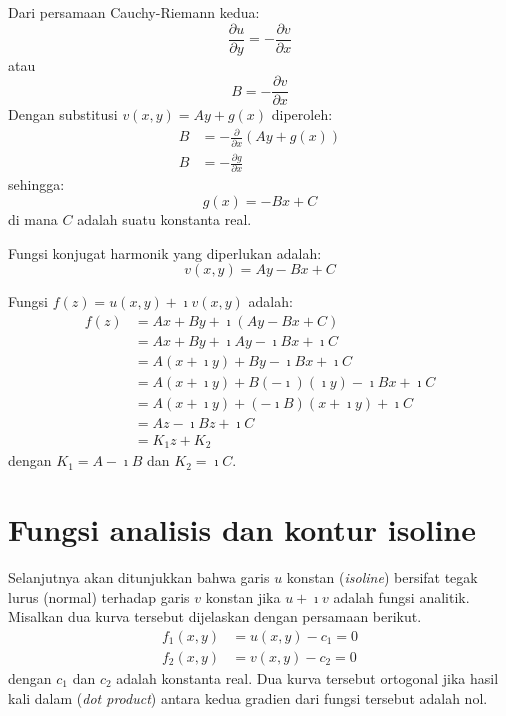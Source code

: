 Dari persamaan Cauchy-Riemann kedua:
\begin{equation*}
\frac{\partial u}{\partial y}=-\frac{\partial v}{\partial x}
\end{equation*}
atau
\begin{equation*}
B = -\frac{\partial v}{\partial x}
\end{equation*}
Dengan substitusi $v(x,y)=Ay+g(x)$ diperoleh:
\begin{align*}
B & =-\frac{\partial}{\partial x}\left(Ay+g(x)\right)\\
B & =-\frac{\partial g}{\partial x}
\end{align*}
sehingga:
\begin{equation*}
g(x)=-Bx+C
\end{equation*}
di mana $C$ adalah suatu konstanta real.

Fungsi konjugat harmonik yang diperlukan adalah:
\begin{equation*}
v(x,y) = Ay - Bx + C
\end{equation*}

Fungsi $f(z) = u(x,y) + \imath v(x,y)$ adalah:
\begin{align*}
f(z) & = Ax + By+\imath\left(Ay - Bx + C\right)\\
 & =Ax+By+\imath Ay-\imath Bx + \imath C\\
 & =A(x+\imath y) + By-\imath Bx + \imath C\\
 & =A(x+\imath y) + B(-\imath)(\imath y) - \imath Bx+\imath C\\
 & =A(x+\imath y) + (-\imath B)(x + \imath y) + \imath C\\
 & =Az - \imath Bz + \imath C\\
 & =K_{1}z + K_{2}
\end{align*}
dengan $K_{1}=A-\imath B$ dan $K_{2}=\imath C$.



\section{Fungsi analisis dan kontur isoline}

Selanjutnya akan ditunjukkan bahwa garis $u$ konstan (\textit{isoline}) bersifat tegak lurus (normal)
terhadap garis $v$ konstan jika $u + \imath v$ adalah fungsi analitik.
Misalkan dua kurva tersebut dijelaskan dengan persamaan berikut.
\begin{align*}
f_{1}(x,y) & = u(x,y) - c_{1} = 0\\
f_{2}(x,y) & = v(x,y) - c_{2} = 0
\end{align*}
dengan $c_1$ dan $c_2$ adalah konstanta real.
Dua kurva tersebut ortogonal jika hasil kali dalam (\textit{dot product}) antara kedua gradien
dari fungsi tersebut adalah nol.

